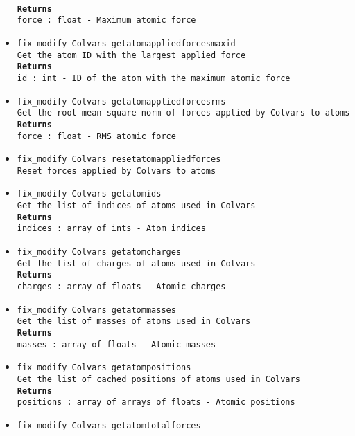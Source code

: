 \begin{itemize}
\\
\texttt{\textbf{Returns}}
\\
\texttt{force : float - Maximum atomic force}
\item \texttt{fix\_modify Colvars getatomappliedforcesmaxid}
\\
\texttt{Get the atom ID with the largest applied force}
\\
\texttt{\textbf{Returns}}
\\
\texttt{id : int - ID of the atom with the maximum atomic force}
\item \texttt{fix\_modify Colvars getatomappliedforcesrms}
\\
\texttt{Get the root-mean-square norm of forces applied by Colvars to atoms}
\\
\texttt{\textbf{Returns}}
\\
\texttt{force : float - RMS atomic force}
\item \texttt{fix\_modify Colvars resetatomappliedforces}
\\
\texttt{Reset forces applied by Colvars to atoms}
\item \texttt{fix\_modify Colvars getatomids}
\\
\texttt{Get the list of indices of atoms used in Colvars}
\\
\texttt{\textbf{Returns}}
\\
\texttt{indices : array of ints - Atom indices}
\item \texttt{fix\_modify Colvars getatomcharges}
\\
\texttt{Get the list of charges of atoms used in Colvars}
\\
\texttt{\textbf{Returns}}
\\
\texttt{charges : array of floats - Atomic charges}
\item \texttt{fix\_modify Colvars getatommasses}
\\
\texttt{Get the list of masses of atoms used in Colvars}
\\
\texttt{\textbf{Returns}}
\\
\texttt{masses : array of floats - Atomic masses}
\item \texttt{fix\_modify Colvars getatompositions}
\\
\texttt{Get the list of cached positions of atoms used in Colvars}
\\
\texttt{\textbf{Returns}}
\\
\texttt{positions : array of arrays of floats - Atomic positions}
\item \texttt{fix\_modify Colvars getatomtotalforces}

\end{itemize}
